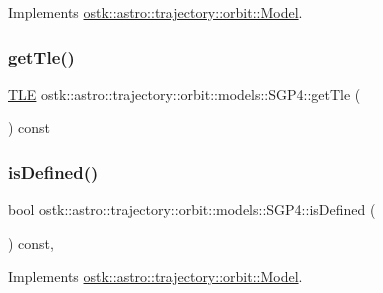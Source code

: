 Implements \hyperlink{classostk_1_1astro_1_1trajectory_1_1orbit_1_1_model_af3f1866f86045da2c05efe4165735cf4}{ostk\+::astro\+::trajectory\+::orbit\+::\+Model}.

\mbox{\label{classostk_1_1astro_1_1trajectory_1_1orbit_1_1models_1_1_s_g_p4_ac1f2188866759569091ebfd8e43919a8}} 
\subsubsection{\texorpdfstring{get\+Tle()}{getTle()}}
{\footnotesize\ttfamily \hyperlink{classostk_1_1astro_1_1trajectory_1_1orbit_1_1models_1_1sgp4_1_1_t_l_e}{T\+LE} ostk\+::astro\+::trajectory\+::orbit\+::models\+::\+S\+G\+P4\+::get\+Tle (\begin{DoxyParamCaption}{ }\end{DoxyParamCaption}) const}

\mbox{\label{classostk_1_1astro_1_1trajectory_1_1orbit_1_1models_1_1_s_g_p4_ab18e0666588bd517c190942b1a54ed18}} 
\subsubsection{\texorpdfstring{is\+Defined()}{isDefined()}}
{\footnotesize\ttfamily bool ostk\+::astro\+::trajectory\+::orbit\+::models\+::\+S\+G\+P4\+::is\+Defined (\begin{DoxyParamCaption}{ }\end{DoxyParamCaption}) const\hspace{0.3cm}{\ttfamily [override]}, {\ttfamily [virtual]}}



Implements \hyperlink{classostk_1_1astro_1_1trajectory_1_1orbit_1_1_model_a13c5b5693dd86a072da0bd0e319bacc2}{ostk\+::astro\+::trajectory\+::orbit\+::\+Model}.

